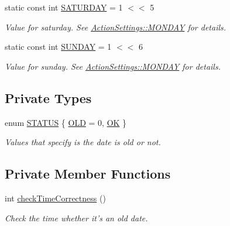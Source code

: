 \begin{DoxyCompactItemize}
static const int \hyperlink{class_action_settings_ad4e99d88dfbfa0b2d920bf87fe2f9f4c}{S\-A\-T\-U\-R\-D\-A\-Y} = 1 $<$$<$ 5
\begin{DoxyCompactList}\small\item\em Value for saturday. See \hyperlink{class_action_settings_a0a99a4562e37a11225063d1a10e0953a}{Action\-Settings\-::\-M\-O\-N\-D\-A\-Y} for details. \end{DoxyCompactList}\item 
static const int \hyperlink{class_action_settings_a84bc1afcb432a8274a028cd21cc416f6}{S\-U\-N\-D\-A\-Y} = 1 $<$$<$ 6
\begin{DoxyCompactList}\small\item\em Value for sunday. See \hyperlink{class_action_settings_a0a99a4562e37a11225063d1a10e0953a}{Action\-Settings\-::\-M\-O\-N\-D\-A\-Y} for details. \end{DoxyCompactList}\end{DoxyCompactItemize}
\subsection*{Private Types}
\begin{DoxyCompactItemize}
\item 
enum \hyperlink{class_action_settings_a9725793607519082b0c0bcfae7ccdcaf}{S\-T\-A\-T\-U\-S} \{ \hyperlink{class_action_settings_a9725793607519082b0c0bcfae7ccdcafa5622bebc14d1d7fbb9b29753297d7457}{O\-L\-D} =  0, 
\hyperlink{class_action_settings_a9725793607519082b0c0bcfae7ccdcafa531446e0f85b69997767554a5e4303f1}{O\-K}
 \}
\begin{DoxyCompactList}\small\item\em Values that specify is the date is old or not. \end{DoxyCompactList}\end{DoxyCompactItemize}
\subsection*{Private Member Functions}
\begin{DoxyCompactItemize}
\item 
int \hyperlink{class_action_settings_a81b3b295828d3c513db553bc114bc4de}{check\-Time\-Correctness} ()
\begin{DoxyCompactList}\small\item\em Check the time whether it's an old date. \end{DoxyCompactList}\end{DoxyCompactItemize}
